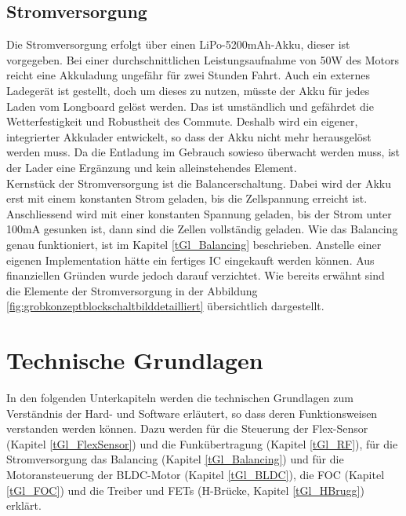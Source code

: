 \subsection*{Stromversorgung}
Die Stromversorgung erfolgt über einen LiPo-5200mAh-Akku, dieser ist vorgegeben. Bei einer durchschnittlichen Leistungsaufnahme von 50W des Motors reicht eine Akkuladung ungefähr für zwei Stunden Fahrt. Auch ein externes Ladegerät ist gestellt, doch um dieses zu nutzen, müsste der Akku für jedes Laden vom Longboard gelöst werden. Das ist umständlich und gefährdet die Wetterfestigkeit und Robustheit des Commute. Deshalb wird ein eigener, integrierter Akkulader entwickelt, so dass der Akku nicht mehr herausgelöst werden muss. Da die Entladung im Gebrauch sowieso überwacht werden muss, ist der Lader eine Ergänzung und kein alleinstehendes Element. \\ Kernstück der Stromversorgung ist die Balancerschaltung. Dabei wird der Akku erst mit einem konstanten Strom geladen, bis die Zellspannung erreicht ist. Anschliessend wird mit einer konstanten Spannung geladen, bis der Strom unter 100mA gesunken ist, dann sind die Zellen vollständig geladen. Wie das Balancing genau funktioniert, ist im Kapitel \ref{tGl_Balancing} beschrieben. Anstelle einer eigenen Implementation hätte ein fertiges IC eingekauft werden können. Aus finanziellen Gründen wurde jedoch darauf verzichtet. Wie bereits erwähnt sind die Elemente der Stromversorgung in der Abbildung \ref{fig:grobkonzeptblockschaltbilddetailliert} übersichtlich dargestellt.



\section{Technische Grundlagen}
In den folgenden Unterkapiteln werden die technischen Grundlagen zum Verständnis der Hard- und Software erläutert, so dass deren Funktionsweisen verstanden werden können.  Dazu werden für die Steuerung der Flex-Sensor (Kapitel \ref{tGl_FlexSensor}) und die Funkübertragung (Kapitel \ref{tGl_RF}), für die Stromversorgung das Balancing (Kapitel \ref{tGl_Balancing}) und für die Motoransteuerung der BLDC-Motor (Kapitel \ref{tGl_BLDC}), die FOC (Kapitel \ref{tGl_FOC}) und die Treiber und FETs (H-Brücke, Kapitel \ref{tGl_HBrugg}) erklärt.


